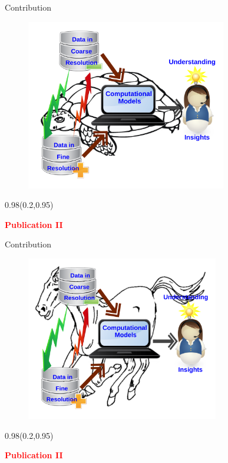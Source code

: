 \documentclass[first=dgreen,second=purple,logo=redexc]{aaltoslides}
\newcommand\FrameText[1]{%
  \begin{textblock*}{0.98\textwidth}(0.2\textwidth,0.95\textheight)
    \textcolor {red}{\scriptsize\raggedright #1\hspace{0.1\textwidth}}
  \end{textblock*}}
\begin{document}
  \begin{frame}{Contribution}
 \begin{figure}
 \centering
   \includegraphics[trim=0cm 0cm 0cm 0cm, clip=true,width=0.78\textwidth]{figures/slow}
 \end{figure}
 \FrameText{\textbf{Publication II}}
 \end{frame}
 
  \begin{frame}{Contribution}
 \begin{figure}
 \centering
   \includegraphics[trim=0cm 0cm 0cm 0cm, clip=true,width=0.75\textwidth]{figures/fast}
 \end{figure}
 \FrameText{\textbf{Publication II}}
 \end{frame}
\end{document}
